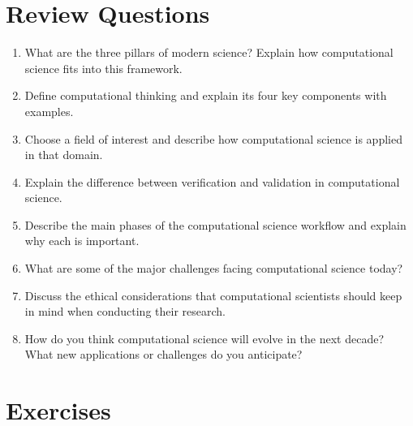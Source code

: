 \section{Review Questions}

\begin{enumerate}
  \item What are the three pillars of modern science? Explain how computational science fits into this framework.
      
  \item Define computational thinking and explain its four key components with examples.
      
  \item Choose a field of interest and describe how computational science is applied in that domain.
      
  \item Explain the difference between verification and validation in computational science.
      
  \item Describe the main phases of the computational science workflow and explain why each is important.
      
  \item What are some of the major challenges facing computational science today?
      
  \item Discuss the ethical considerations that computational scientists should keep in mind when conducting their research.
      
  \item How do you think computational science will evolve in the next decade? What new applications or challenges do you anticipate?
\end{enumerate}

\section{Exercises}

